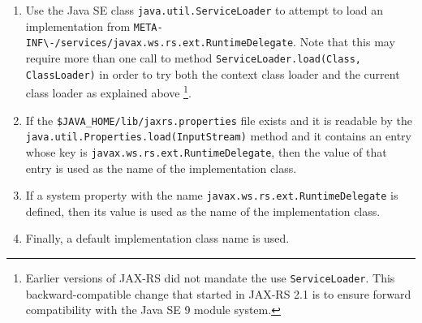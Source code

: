 \begin{enumerate}
    \item Use the Java SE class \lstinline{java.util.ServiceLoader} to attempt to load an implementation from
    \lstinline{META-INF\-/services/javax.ws.rs.ext.RuntimeDelegate}. Note that this may require more than one call to
    method \lstinline{ServiceLoader.load(Class, ClassLoader)} in order to try both the context class loader and the
    current class loader as explained above
    \footnote{Earlier versions of JAX-RS did not mandate the use \lstinline{ServiceLoader}. This backward-compatible
    change that started in JAX-RS 2.1 is to ensure forward compatibility with the Java SE 9 module system.}.
    \item If the \lstinline{$JAVA_HOME/lib/jaxrs.properties} file exists and it is readable by the
    \lstinline{java.util.Properties.load(InputStream)} method and it contains an entry whose key is
    \lstinline{javax.ws.rs.ext.RuntimeDelegate}, then the value of that entry is used as the name of the implementation
    class.
    \item If a system property with the name \lstinline{javax.ws.rs.ext.RuntimeDelegate} is defined, then its value is
    used as the name of the implementation class.
    \item Finally, a default implementation class name is used.
\end{enumerate}
